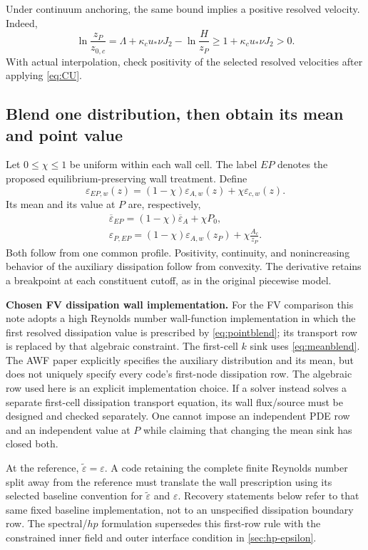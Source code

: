 \documentclass[11pt,a4paper]{article}
\numberwithin{equation}{section}
\newcommand{\eps}{\varepsilon}
\newcommand{\et}{\widetilde{\varepsilon}}
\newcommand{\ust}{u_*}
\newcommand{\kc}{\kappa_c}
\newcommand{\avg}[1]{\overline{#1}}
\newcommand{\Aref}{A_c}
\newcommand{\EAw}{\eps_{A,w}}
\newcommand{\ECw}{\eps_{c,w}}
\newcommand{\EEP}{\eps_{EP,w}}
\begin{document}
Under continuum anchoring, the same bound implies a positive resolved
velocity. Indeed,
\begin{equation}
 \ln\frac{z_P}{z_{0,c}}
 =\Lambda+\kc\ust\nu J_2-\ln\frac H{z_P}
 \geq1+\kc\ust\nu J_2>0.
 \label{eq:UPpositive}
\end{equation}
With actual interpolation, check positivity of the selected resolved
velocities after applying \cref{eq:CU}.

\subsection{Blend one distribution, then obtain its mean and point value}
Let $0\leq\chi\leq1$ be uniform within each wall cell. The label
$EP$ denotes the proposed equilibrium-preserving wall treatment. Define
\begin{equation}
 \boxed{\EEP(z)=(1-\chi)\EAw(z)+\chi\ECw(z).}
 \label{eq:blend}
\end{equation}
Its mean and its value at $P$ are, respectively,
\begin{align}
 \boxed{\avg\eps_{EP}=(1-\chi)\avg\eps_A+\chi P_0,}
 \label{eq:meanblend}\\
 \boxed{\eps_{P,EP}=(1-\chi)\EAw(z_P)+\chi\frac{\Aref}{z_P}.}
 \label{eq:pointblend}
\end{align}
Both follow from one common profile. Positivity, continuity, and
nonincreasing behavior of the auxiliary dissipation follow from convexity.
The derivative retains a breakpoint at each constituent cutoff, as in the
original piecewise model.

\textbf{Chosen FV dissipation wall implementation.}
For the FV comparison this note adopts a high Reynolds number wall-function implementation in
which the first resolved dissipation value is prescribed by
\cref{eq:pointblend}; its transport row is replaced by that algebraic
constraint. The first-cell $k$ sink uses \cref{eq:meanblend}.
The AWF paper explicitly specifies the auxiliary distribution and its
mean, but does not uniquely specify every code's first-node dissipation
row. The algebraic row used here is an explicit implementation choice.
If a solver instead solves a separate first-cell dissipation transport
equation, its wall flux/source must be designed and checked separately.
One cannot impose an independent PDE row and an independent value at $P$
while claiming that changing the mean sink has closed both.

At the reference, $\et=\eps$. A code retaining the complete
finite Reynolds number split away from the reference must translate the
wall prescription using its selected baseline convention for
$\et$ and $\eps$. Recovery statements below refer to that same fixed
baseline implementation, not to an unspecified dissipation boundary row.
The spectral/$hp$ formulation supersedes this first-row rule with the
constrained inner field and outer interface condition in
\cref{sec:hp-epsilon}.
\end{document}
